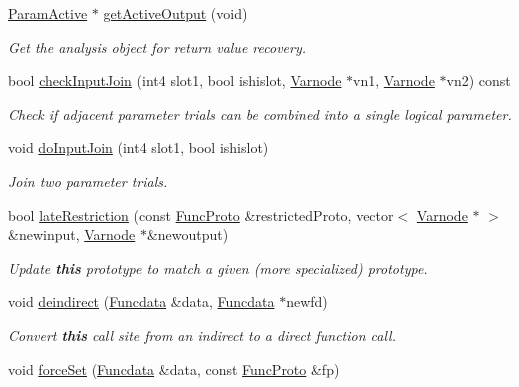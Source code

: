 \begin{DoxyCompactItemize}
\mbox{\hyperlink{class_param_active}{Param\+Active}} $\ast$ \mbox{\hyperlink{class_func_call_specs_a866e9a9406614829224612035f28d311}{get\+Active\+Output}} (void)
\begin{DoxyCompactList}\small\item\em Get the analysis object for return value recovery. \end{DoxyCompactList}\item 
bool \mbox{\hyperlink{class_func_call_specs_a808f3d0c962701b6c98bca1792e86908}{check\+Input\+Join}} (int4 slot1, bool ishislot, \mbox{\hyperlink{class_varnode}{Varnode}} $\ast$vn1, \mbox{\hyperlink{class_varnode}{Varnode}} $\ast$vn2) const
\begin{DoxyCompactList}\small\item\em Check if adjacent parameter trials can be combined into a single logical parameter. \end{DoxyCompactList}\item 
void \mbox{\hyperlink{class_func_call_specs_a489441d9d77d08bdf87eff937e8ef5b8}{do\+Input\+Join}} (int4 slot1, bool ishislot)
\begin{DoxyCompactList}\small\item\em Join two parameter trials. \end{DoxyCompactList}\item 
bool \mbox{\hyperlink{class_func_call_specs_ab55b52b70e4def9167d06709746635e9}{late\+Restriction}} (const \mbox{\hyperlink{class_func_proto}{Func\+Proto}} \&restricted\+Proto, vector$<$ \mbox{\hyperlink{class_varnode}{Varnode}} $\ast$ $>$ \&newinput, \mbox{\hyperlink{class_varnode}{Varnode}} $\ast$\&newoutput)
\begin{DoxyCompactList}\small\item\em Update {\bfseries{this}} prototype to match a given (more specialized) prototype. \end{DoxyCompactList}\item 
void \mbox{\hyperlink{class_func_call_specs_aad64d557811baf4602afcefb2746f7be}{deindirect}} (\mbox{\hyperlink{class_funcdata}{Funcdata}} \&data, \mbox{\hyperlink{class_funcdata}{Funcdata}} $\ast$newfd)
\begin{DoxyCompactList}\small\item\em Convert {\bfseries{this}} call site from an indirect to a direct function call. \end{DoxyCompactList}\item 
void \mbox{\hyperlink{class_func_call_specs_a8bc0ef657c876530f21a6ae60458eb35}{force\+Set}} (\mbox{\hyperlink{class_funcdata}{Funcdata}} \&data, const \mbox{\hyperlink{class_func_proto}{Func\+Proto}} \&fp)

\end{DoxyCompactItemize}
